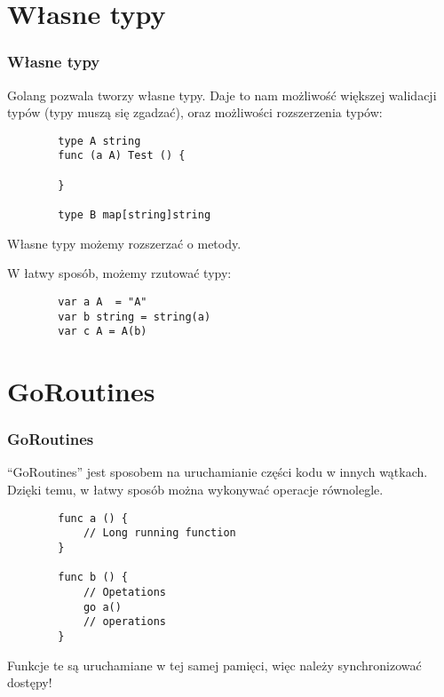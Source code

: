 \documentclass[10pt]{beamer}
\newcommand{\quotes}[1]{``#1''}
\begin{document}
\section[Własne typy]{Własne typy}
\begin{frame}[fragile]
    \frametitle{Własne typy}
    Golang pozwala tworzy własne typy. Daje to nam możliwość większej
    walidacji typów (typy muszą się zgadzać), oraz możliwości rozszerzenia typów:

    \begin{verbatim}
        type A string
        func (a A) Test () {

        }

        type B map[string]string
    \end{verbatim}

    Własne typy możemy rozszerzać o metody.
    
    W łatwy sposób, możemy rzutować typy:

    \begin{verbatim}
        var a A  = "A"
        var b string = string(a)
        var c A = A(b)
    \end{verbatim}
\end{frame}

\section[Wskaźniki]{GoRoutines}
\begin{frame}[fragile]
    \frametitle{GoRoutines}
    \quotes{GoRoutines} jest sposobem na uruchamianie części kodu w innych wątkach.
    Dzięki temu, w łatwy sposób można wykonywać operacje równolegle.

    \begin{verbatim}
        func a () {
            // Long running function
        }

        func b () {
            // Opetations
            go a()
            // operations
        }
    \end{verbatim}

    Funkcje te są uruchamiane w tej samej pamięci, więc należy synchronizować dostępy!
\end{frame}
\end{document}
